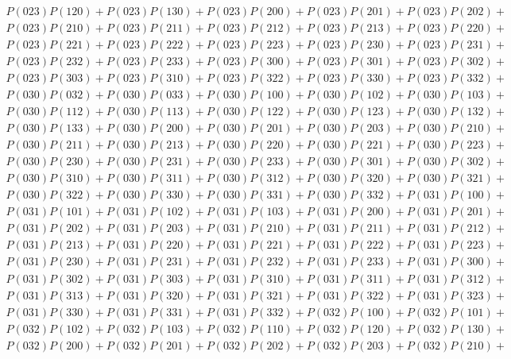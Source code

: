 \documentclass{article}
\theoremstyle{definition}
\begin{document}
\begin{gather*}
        P(023)P(120) + P(023)P(130) + P(023)P(200) + P(023)P(201) + P(023)P(202) +\\
        P(023)P(210) + P(023)P(211) + P(023)P(212) + P(023)P(213) + P(023)P(220) +\\
        P(023)P(221) + P(023)P(222) + P(023)P(223) + P(023)P(230) + P(023)P(231) +\\
        P(023)P(232) + P(023)P(233) + P(023)P(300) + P(023)P(301) + P(023)P(302) +\\
        P(023)P(303) + P(023)P(310) + P(023)P(322) + P(023)P(330) + P(023)P(332) +\\
        P(030)P(032) + P(030)P(033) + P(030)P(100) + P(030)P(102) + P(030)P(103) +\\
        P(030)P(112) + P(030)P(113) + P(030)P(122) + P(030)P(123) + P(030)P(132) +\\
        P(030)P(133) + P(030)P(200) + P(030)P(201) + P(030)P(203) + P(030)P(210) +\\
        P(030)P(211) + P(030)P(213) + P(030)P(220) + P(030)P(221) + P(030)P(223) +\\
        P(030)P(230) + P(030)P(231) + P(030)P(233) + P(030)P(301) + P(030)P(302) +\\
        P(030)P(310) + P(030)P(311) + P(030)P(312) + P(030)P(320) + P(030)P(321) +\\
        P(030)P(322) + P(030)P(330) + P(030)P(331) + P(030)P(332) + P(031)P(100) +\\
        P(031)P(101) + P(031)P(102) + P(031)P(103) + P(031)P(200) + P(031)P(201) +\\
        P(031)P(202) + P(031)P(203) + P(031)P(210) + P(031)P(211) + P(031)P(212) +\\
        P(031)P(213) + P(031)P(220) + P(031)P(221) + P(031)P(222) + P(031)P(223) +\\
        P(031)P(230) + P(031)P(231) + P(031)P(232) + P(031)P(233) + P(031)P(300) +\\
        P(031)P(302) + P(031)P(303) + P(031)P(310) + P(031)P(311) + P(031)P(312) +\\
        P(031)P(313) + P(031)P(320) + P(031)P(321) + P(031)P(322) + P(031)P(323) +\\
        P(031)P(330) + P(031)P(331) + P(031)P(332) + P(032)P(100) + P(032)P(101) +\\
        P(032)P(102) + P(032)P(103) + P(032)P(110) + P(032)P(120) + P(032)P(130) +\\
        P(032)P(200) + P(032)P(201) + P(032)P(202) + P(032)P(203) + P(032)P(210) +\\

\end{gather*}
\end{document}
